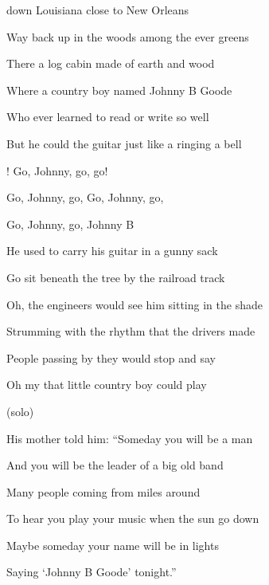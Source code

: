 
\zs
{} down Louisiana close to New   Orleans

Way back up in the woods among the ever  greens

There  a log cabin made of earth and wood

Where  a country boy named Johnny B Goode

Who  ever learned to read or write so well

But he could  the guitar just like a ringing a bell
\ks

\zr
{}! Go, Johnny, go, go!

Go, Johnny, go,  Go, Johnny, go, 

Go, Johnny, go,  Johnny B 
\kr

\zs
He used to carry his guitar in a gunny sack

Go sit beneath the tree by the railroad track

Oh, the engineers would see him sitting in the shade

Strumming with the rhythm that the drivers made

People passing by they would stop and say

Oh my that little country boy could play
\ks

\zr\kr

\zs (solo) \ks 

\zs
His mother told him: ``Someday you will be a  man

And you will be the leader of a big old band

Many people coming from miles around

To hear you play your music when the sun go down

Maybe someday your name will be in lights

Saying `Johnny B Goode' tonight.''
\ks

\zr\kr
\kp
